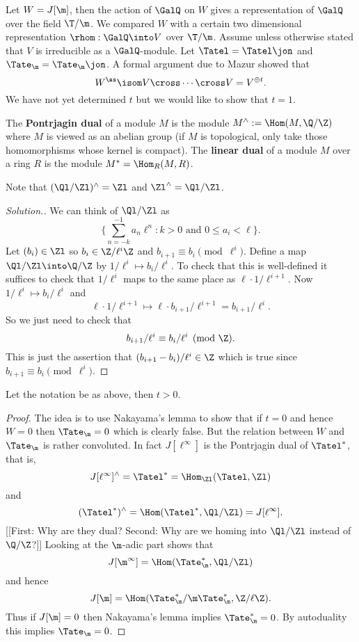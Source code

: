 \documentclass{report}
\begin{document}
Let $W=J[\m]$, then the action of $\GalQ$ on $W$ gives a representation
of $\GalQ$ over the field $\T/\m$. We compared $W$ with a certain two
dimensional representation $\rhom:\GalQ\into V$ over $\T/\m$.
Assume unless otherwise stated that $V$ is irreducible
as a $\GalQ$-module. Let $\Tatel=\Tatel\jon$ and $\Tate_\m=\Tate_\m\jon$.
A formal argument due to Mazur showed that
$$W^{\ss}\isom V\cross \cdots \cross V=V^{\oplus t}.$$
We have not yet determined $t$ but we would like to show that $t=1$.
\begin{defn}
The {\bfseries Pontrjagin dual} of a module $M$ is the module
$M^{\wedge}:=\Hom(M,\Q/\Z)$ where $M$ is viewed as an abelian group
(if $M$ is topological, only take those homomorphisms whose kernel
is compact).
The {\bfseries linear dual} of a module $M$ over a ring $R$ is
the module $M^*=\Hom_R(M,R)$.
\end{defn}
\begin{exercise}
Note that $(\Ql/\Zl)^{\wedge}=\Zl$ and $\Zl^{\wedge}=\Ql/\Zl$.
\end{exercise}
\begin{proof}[Solution.] We can think of $\Ql/\Zl$ as
$$\{\sum_{n=-k}^{-1} a_n\ell^n: k>0\text{ and } 0\leq a_i<\ell\}.$$
Let $(b_i)\in\Zl$ so $b_i\in\Z/\ell^i\Z$ and
$b_{i+1}\equiv b_i\pmod{\ell^i}$.  Define a map
$\Ql/\Zl\into\Q/\Z$ by $1/\ell^i\mapsto b_i/\ell^i$.
To check that this is well-defined it suffices to
check that $1/\ell^i$ maps to the same place as $\ell\cdot 1/\ell^{i+1}$.
Now $1/\ell^i\mapsto b_i/\ell^i$ and
$$\ell\cdot 1/\ell^{i+1}\mapsto \ell\cdot b_{i+1}/\ell^{i+1}=b_{i+1}/\ell^i.$$
So we just need to check that $$b_{i+1}/\ell^i\equiv b_i/\ell^i\pmod{\Z}.$$
This is just the assertion that $(b_{i+1}-b_{i})/\ell^i\in\Z$ which
is true since $b_{i+1}\equiv b_{i}\pmod{\ell^i}$.
\end{proof}

\begin{proposition}
Let the notation be as above, then $t>0.$
\end{proposition}
\begin{proof}
The idea is to use Nakayama's lemma to show that if $t=0$ and hence $W=0$
then $\Tate_\m=0$ which is clearly false. But the relation between
$W$ and $\Tate_\m$ is rather convoluted. In fact $J[\ell^{\infty}]$ is the
Pontrjagin dual of $\Tatel^*$, that is,
$$J[\ell^{\infty}]^{\wedge}=\Tatel^*=\Hom_{\Zl}(\Tatel,\Zl)$$
and
$$(\Tatel^*)^{\wedge}=\Hom(\Tatel^*,\Ql/\Zl)=J[\ell^{\infty}].$$
[[First: Why are they dual? Second: Why are we homing into
$\Ql/\Zl$ instead of $\Q/\Z$?]]
Looking at the $\m$-adic part shows that
$$J[\m^{\infty}]=\Hom(\Tate_\m^*,\Ql/\Zl)$$
and hence
$$J[\m]=\Hom(\Tate_\m^*/\m\Tate_\m^*,\Z/\ell\Z).$$
Thus if $J[\m]=0$ then Nakayama's lemma
implies $\Tate_\m^*=0$. By autoduality this implies
$\Tate_\m=0$.
\end{proof}
\end{document}
